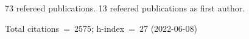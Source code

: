 73 refereed publications. 13 refeered publications as first author.

Total citations~=~2575; h-index~=~27 (2022-06-08)